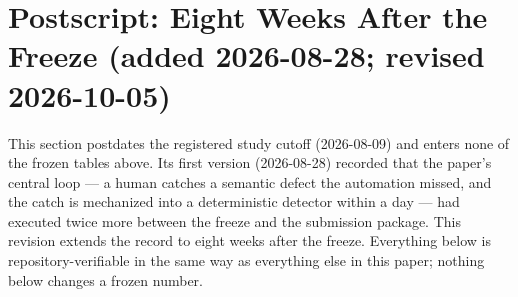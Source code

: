 \documentclass[11pt]{article}
\begin{document}
\section*{Postscript: Eight Weeks After the Freeze (added 2026-08-28; revised 2026-10-05)}
\label{sec:postscript}

This section postdates the registered study cutoff (2026-08-09) and
enters none of the frozen tables above. Its first version (2026-08-28)
recorded that the paper's central loop --- a human catches a semantic
defect the automation missed, and the catch is mechanized into a
deterministic detector within a day --- had executed twice more between
the freeze and the submission package. This revision extends the record
to eight weeks after the freeze. Everything below is
repository-verifiable in the same way as everything else in this paper;
nothing below changes a frozen number.
\end{document}
